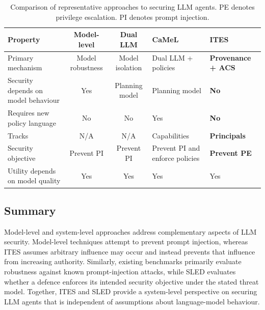 \documentclass{article} %
\begin{document}
\begin{table}[t]
\centering
\small
\renewcommand{\arraystretch}{1.3}
\begin{tabular}{p{3.4cm}ccp{2cm}p{2cm}}
\toprule
Property & Model-level & Dual LLM & CaMeL & \textbf{ITES} \\
\midrule
Primary mechanism &
Model robustness &
Model isolation &
Dual LLM + policies &
\textbf{Provenance + ACS} \\[2pt]

Security depends on model behaviour &
Yes &
Planning model &
Planning model &
\textbf{No} \\[2pt]

Requires new policy language &
No &
No &
Yes &
\textbf{No} \\[2pt]

Tracks &
N/A &
N/A &
Capabilities &
\textbf{Principals} \\[2pt]

Security objective &
Prevent PI &
Prevent PI &
Prevent PI and enforce policies &
\textbf{Prevent PE} \\[2pt]

Utility depends on model quality &
Yes &
Yes &
Yes &
Yes \\[2pt]
\bottomrule
\end{tabular}
\renewcommand{\arraystretch}{1}
\caption{Comparison of representative approaches to securing LLM agents. PE denotes privilege escalation. PI denotes prompt injection.}
\label{tab:comparison}
\end{table}

\subsection{Summary}

Model-level and system-level approaches address complementary aspects of LLM security. Model-level techniques attempt to prevent prompt injection, whereas ITES assumes arbitrary influence may occur and instead prevents that influence from increasing authority. Similarly, existing benchmarks primarily evaluate robustness against known prompt-injection attacks, while SLED evaluates whether a defence enforces its intended security objective under the stated threat model. Together, ITES and SLED provide a system-level perspective on securing LLM agents that is independent of assumptions about language-model behaviour.
\end{document}
